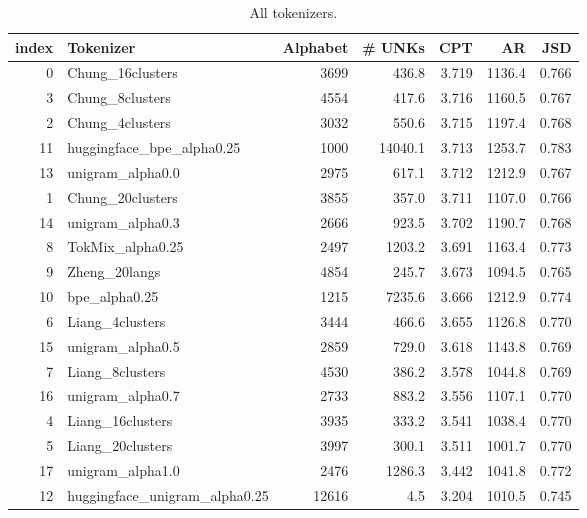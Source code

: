 \begin{table}
\caption{All tokenizers.}
\label{tab:all_tokenizers_metrics}
\begin{tabular}{rlrrrrr}
\toprule
index & Tokenizer & Alphabet & \# UNKs & CPT & AR & JSD \\
\midrule
0 & Chung\_16clusters & 3699 & 436.8 & 3.719 & 1136.4 & 0.766 \\
3 & Chung\_8clusters & 4554 & 417.6 & 3.716 & 1160.5 & 0.767 \\
2 & Chung\_4clusters & 3032 & 550.6 & 3.715 & 1197.4 & 0.768 \\
11 & huggingface\_bpe\_alpha0.25 & 1000 & 14040.1 & 3.713 & 1253.7 & 0.783 \\
13 & unigram\_alpha0.0 & 2975 & 617.1 & 3.712 & 1212.9 & 0.767 \\
1 & Chung\_20clusters & 3855 & 357.0 & 3.711 & 1107.0 & 0.766 \\
14 & unigram\_alpha0.3 & 2666 & 923.5 & 3.702 & 1190.7 & 0.768 \\
8 & TokMix\_alpha0.25 & 2497 & 1203.2 & 3.691 & 1163.4 & 0.773 \\
9 & Zheng\_20langs & 4854 & 245.7 & 3.673 & 1094.5 & 0.765 \\
10 & bpe\_alpha0.25 & 1215 & 7235.6 & 3.666 & 1212.9 & 0.774 \\
6 & Liang\_4clusters & 3444 & 466.6 & 3.655 & 1126.8 & 0.770 \\
15 & unigram\_alpha0.5 & 2859 & 729.0 & 3.618 & 1143.8 & 0.769 \\
7 & Liang\_8clusters & 4530 & 386.2 & 3.578 & 1044.8 & 0.769 \\
16 & unigram\_alpha0.7 & 2733 & 883.2 & 3.556 & 1107.1 & 0.770 \\
4 & Liang\_16clusters & 3935 & 333.2 & 3.541 & 1038.4 & 0.770 \\
5 & Liang\_20clusters & 3997 & 300.1 & 3.511 & 1001.7 & 0.770 \\
17 & unigram\_alpha1.0 & 2476 & 1286.3 & 3.442 & 1041.8 & 0.772 \\
12 & huggingface\_unigram\_alpha0.25 & 12616 & 4.5 & 3.204 & 1010.5 & 0.745 \\
\bottomrule
\end{tabular}
\end{table}
